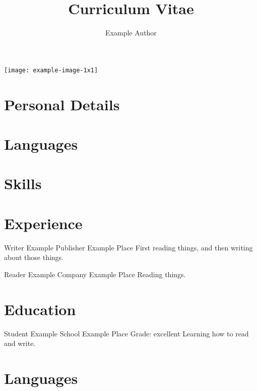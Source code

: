 \documentclass[
  biblatex,
  signcv,
  14pt,a4paper
]{polycv}
\title{Curriculum Vitae}
\author{Example Author}
\begin{document}
\nocite{*}%
\begin{polycvsidebar}
\small

\texttt{[image: example-image-1x1]}\\[2ex]

\section{Personal Details}
\polycvlineaddress
\polycvlineemail
\polycvlinephone
\polycvlinemobile
\polycvlineorcid
\polycvlinegithub
\null

\section{Languages}

\section{Skills}

\end{polycvsidebar}%
\section{Experience}
{Writer}
{Example Publisher}
{Example Place}
{}
{First reading things, and then writing about those things.}

{Reader}
{Example Company}
{Example Place}
{}
{Reading things.}

\section{Education}
{Student}
{Example School}
{Example Place}
{Grade: excellent}
{Learning how to read and write.}

\section{Languages}
\end{document}

